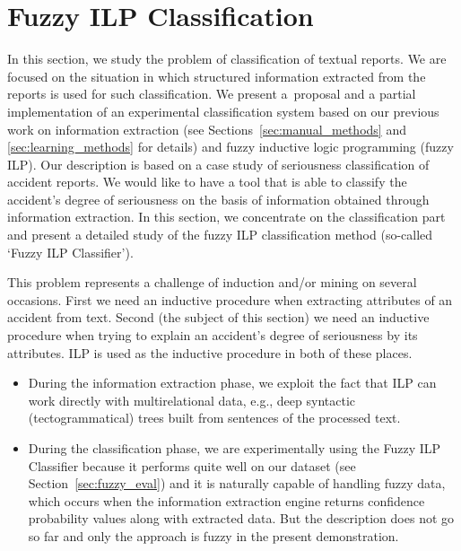 \section{Fuzzy ILP Classification} \label{sec:fuzzy_methods}
\graphicspath{{../img/ch80/}}

In this section, we study the problem of classification of textual reports. We are %
 focused on the situation in which structured information extracted from the reports is used for such classification. We present a~proposal and a partial implementation of an experimental classification system based on our previous work on information extraction (see Sections~\ref{sec:manual_methods} and \ref{sec:learning_methods} for details) and fuzzy inductive logic programming (fuzzy ILP).
Our description is based on a case study of seriousness classification of accident reports. 
We would like to have a tool that is able to classify the accident's degree of seriousness on the basis of information obtained through information extraction.
In this section,
we concentrate on the classification part and present a detailed study of the fuzzy ILP classification method (so-called `Fuzzy ILP Classifier'). 

This problem represents a challenge of induction and/or mining on several occasions. First we need an inductive procedure when extracting attributes of an accident from text. Second (the subject of this section) we need an inductive procedure when trying to explain an accident's degree of seriousness by its attributes. ILP is used as the inductive procedure in both of these places.
\begin{itemize}
	\item During the information extraction phase, we exploit the fact that ILP can work directly with multirelational data, e.g., deep syntactic (tectogrammatical) trees built from sentences of the processed text.
	\item During the classification phase, we are experimentally using the Fuzzy ILP Classifier because it performs quite well on our dataset (see Section~\ref{sec:fuzzy_eval}) and it is naturally capable of handling fuzzy data, which occurs when the information extraction engine returns confidence probability values along with extracted data. But the description does not go so far and only the approach is fuzzy in the present demonstration.
\end{itemize}





